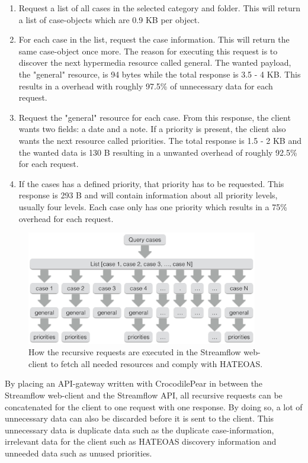 \documentclass{cslthse-msc}
\begin{document}
\begin{enumerate}
	\item Request a list of all cases in the selected category and folder. This will return a list of case-objects which are 0.9 KB per object.
	\item For each case in the list, request the case information. This will return the same case-object once more. The reason for executing this request is to discover the next hypermedia resource called general. The wanted payload, the "general" resource, is 94 bytes while the total response is 3.5 - 4 KB. This results in a overhead with roughly 97.5\% of unnecessary data for each request.
	\item Request the "general" resource for each case. From this response, the client wants two fields: a date and a note. If a priority is present, the client also wants the next resource called priorities. The total response is 1.5 - 2 KB and the wanted data is 130 B resulting in a unwanted overhead of roughly 92.5\% for each request.
	\item If the cases has a defined priority, that priority has to be requested. This response is 293 B and will contain information about all priority levels, usually four levels. Each case only has one priority which results in a 75\% overhead for each request.
\end{enumerate}

\begin{figure}[H]
  \centering
    \begin{center}
      \includegraphics[width=0.9\textwidth]{images/streamflow_cases.png}
    \end{center}
  \caption{How the recursive requests are executed in the Streamflow web-client to fetch all needed resources and comply with HATEOAS.}
\end{figure}

By placing an API-gateway written with CrocodilePear in between the Streamflow web-client and the Streamflow API, all recursive requests can be concatenated for the client to one request with one response. By doing so, a lot of unnecessary data can also be discarded before it is sent to the client. This unnecessary data is duplicate data such as the duplicate case-information, irrelevant data for the client such as HATEOAS discovery information and unneeded data such as unused priorities.
\end{document}
